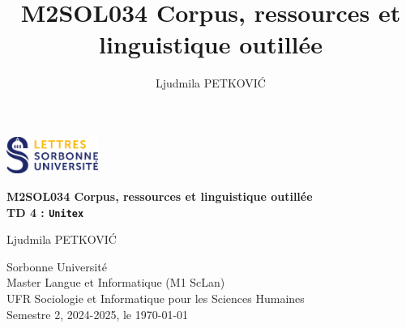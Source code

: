 \documentclass[xcolor={table,usenames,dvipsnames}]{article}
\author{Ljudmila PETKOVI\'C}
\title{\textbf{\textsc{M2SOL034} Corpus, ressources et linguistique outillée}}
\begin{document}
	
	\begin{center}
		\includegraphics[width=3cm]{img/logo.png} %
	\end{center}
	
	\begin{tcolorbox}[colback=myblue!10, colframe=myblue, width=\textwidth, sharp corners, boxrule=1pt]
		\centering
		\Large \textbf{\textsc{M2SOL034} Corpus, ressources et linguistique outillée\\{\large\textsc{TD 4} : \texttt{Unitex}}}
	\end{tcolorbox}
	
	\begin{center}
		Ljudmila PETKOVI\'C
		
		{\small Sorbonne Université\\Master \og{}Langue et Informatique\fg{} (\textsc{M1} ScLan)\\\textsc{UFR} Sociologie et Informatique pour les Sciences Humaines\\Semestre 2, 2024-2025, le \today}
	\end{center}
	


		
	\tableofcontents
	
	\bigskip
	
\end{document}
